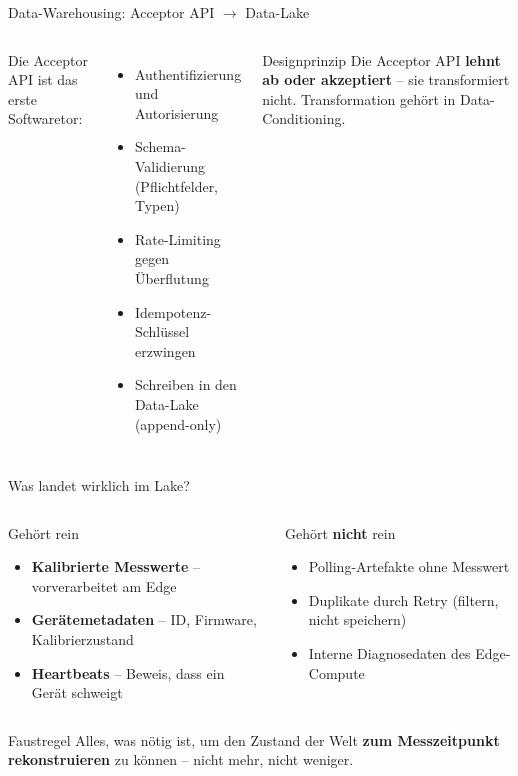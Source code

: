 \documentclass[aspectratio=169]{beamer}
\begin{document}
\begin{frame}{Data-Warehousing: Acceptor API $\rightarrow$ Data-Lake}
  \begin{columns}
      Die Acceptor API ist das erste Softwaretor:
      \begin{itemize}
        \item Authentifizierung und Autorisierung
        \item Schema-Validierung (Pflichtfelder, Typen)
        \item Rate-Limiting gegen Überflutung
        \item Idempotenz-Schlüssel erzwingen
        \item Schreiben in den Data-Lake (append-only)
      \end{itemize}
      \begin{exampleblock}{Designprinzip}
        Die Acceptor API \textbf{lehnt ab oder akzeptiert} –
        sie transformiert nicht.
        Transformation gehört in Data-Conditioning.
      \end{exampleblock}
  \end{columns}
\end{frame}

\begin{frame}{Was landet wirklich im Lake?}
  \begin{columns}
      \begin{block}{Gehört rein}
        \begin{itemize}
          \item \textbf{Kalibrierte Messwerte} – vorverarbeitet am Edge
          \item \textbf{Gerätemetadaten} – ID, Firmware, Kalibrierzustand
          \item \textbf{Heartbeats} – Beweis, dass ein Gerät schweigt
        \end{itemize}
      \end{block}
      \begin{alertblock}{Gehört \textbf{nicht} rein}
        \begin{itemize}
          \item Polling-Artefakte ohne Messwert
          \item Duplikate durch Retry (filtern, nicht speichern)
          \item Interne Diagnosedaten des Edge-Compute
        \end{itemize}
      \end{alertblock}
  \end{columns}
  \vspace{0.5em}
  \begin{exampleblock}{Faustregel}
    Alles, was nötig ist, um den Zustand der Welt
    \textbf{zum Messzeitpunkt rekonstruieren} zu können – nicht mehr, nicht weniger.
  \end{exampleblock}
\end{frame}
\end{document}
